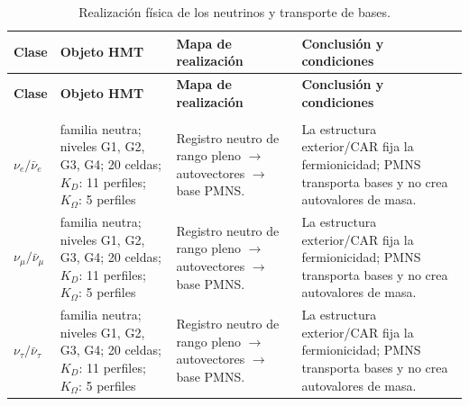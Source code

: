 \begingroup
\setlength{\tabcolsep}{4.5pt}
\renewcommand{\arraystretch}{1.28}
\begin{longtable}{@{}>{\raggedright\arraybackslash}p{}>{\raggedright\arraybackslash}p{}>{\raggedright\arraybackslash}p{}>{\raggedright\arraybackslash}p{}@{}}
\caption{Realización física de los neutrinos y transporte de bases.}\label{tab:masas-realizacion-neutrinos}\\
\toprule
\textbf{Clase} & \textbf{Objeto HMT} & \textbf{Mapa de realización} & \textbf{Conclusión y condiciones} \\
\midrule
\endfirsthead
\toprule
\textbf{Clase} & \textbf{Objeto HMT} & \textbf{Mapa de realización} & \textbf{Conclusión y condiciones} \\
\midrule
\endhead
\midrule
\multicolumn{4}{r}{\footnotesize Continúa en la página siguiente.}\\
\endfoot
\bottomrule
\endlastfoot
$\nu_e/\bar\nu_e$ & familia neutra; niveles G1, G2, G3, G4; 20 celdas; $K_D$: 11 perfiles; $K_\Omega$: 5 perfiles & Registro neutro de rango pleno $\to$ autovectores $\to$ base PMNS. & La estructura exterior/CAR fija la fermionicidad; PMNS transporta bases y no crea autovalores de masa. \\
$\nu_\mu/\bar\nu_\mu$ & familia neutra; niveles G1, G2, G3, G4; 20 celdas; $K_D$: 11 perfiles; $K_\Omega$: 5 perfiles & Registro neutro de rango pleno $\to$ autovectores $\to$ base PMNS. & La estructura exterior/CAR fija la fermionicidad; PMNS transporta bases y no crea autovalores de masa. \\
$\nu_\tau/\bar\nu_\tau$ & familia neutra; niveles G1, G2, G3, G4; 20 celdas; $K_D$: 11 perfiles; $K_\Omega$: 5 perfiles & Registro neutro de rango pleno $\to$ autovectores $\to$ base PMNS. & La estructura exterior/CAR fija la fermionicidad; PMNS transporta bases y no crea autovalores de masa. \\
\end{longtable}
\endgroup
